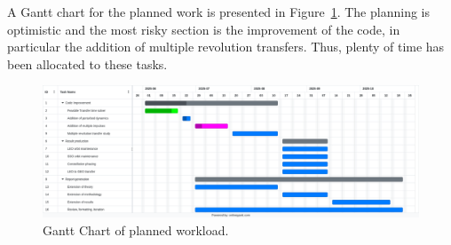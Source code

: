 A Gantt chart for the planned work is presented in Figure~\ref{fig:planning}. The planning is optimistic and the most risky section is the improvement of the code, in particular the addition of multiple revolution transfers. Thus, plenty of time has been allocated to these tasks.

\begin{figure}[htbp]
    \centering
    \includegraphics[width=\textwidth]{img/Planning.png}
    \caption{Gantt Chart of planned workload.}
    \label{fig:planning}
\end{figure}